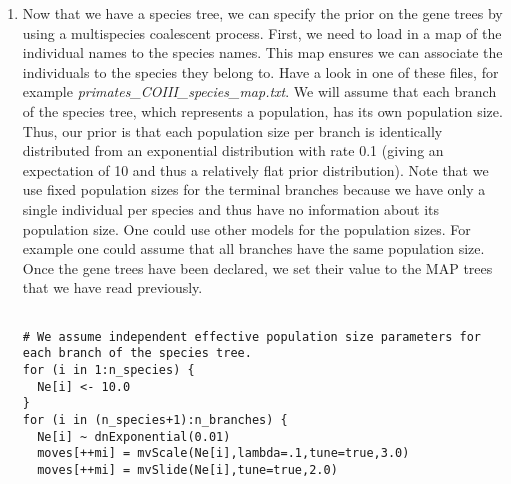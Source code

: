 \begin{enumerate}
{\tt \begin{snugshade*}
\begin{lstlisting}

# read in each gene tree separately
j=1
for ( i in 1:num_loci ) {
    gene_trees[i] <- readTrees("output_GeneTrees/" + locus_names[i] + "_MAP.tree")[1]
    print("Gene tree "+i+ " has "+ gene_trees[i].ntips() + " tips.")
}

# We set the species tree to a good starting value.
# This good starting value is obtained from the Maximum Tree method (Liu, 2006).
# The same method is used in BEST to obtain a good starting species tree.
recTree <- maximumTree(gene_trees)
psi.setValue(recTree)
root.setValue(recTree.rootAge())

write("\t\tProposed starting species tree: ")
write( psi)
write("\t\tWith root age: " + root)

\end{lstlisting}
\end{snugshade*}}

\item Now that we have a species tree, we can specify the prior on the gene trees by using a multispecies coalescent process.
First, we need to load in a map of the individual names to the species names.
This map ensures we can associate the individuals to the species they belong to.
Have a look in one of these files, for example \textit{primates\_COIII\_species\_map.txt}.
We will assume that each branch of the species tree, which represents a population, has its own population size.
Thus, our prior is that each population size per branch is identically distributed from an exponential distribution with rate 0.1 (giving an expectation of 10 and thus a relatively flat prior distribution).
Note that we use fixed population sizes for the terminal branches because we have only a single individual per species and thus have no information about its population size.
One could use other models for the population sizes.
For example one could assume that all branches have the same population size.
Once the gene trees have been declared, we set their value to the MAP trees that we have read previously.

{\tt \begin{snugshade*}
\begin{lstlisting}

# We assume independent effective population size parameters for each branch of the species tree.
for (i in 1:n_species) {
  Ne[i] <- 10.0
}
for (i in (n_species+1):n_branches) {
  Ne[i] ~ dnExponential(0.01)
  moves[++mi] = mvScale(Ne[i],lambda=.1,tune=true,3.0)
  moves[++mi] = mvSlide(Ne[i],tune=true,2.0)


\end{lstlisting}
\end{snugshade*}}
\end{enumerate}
